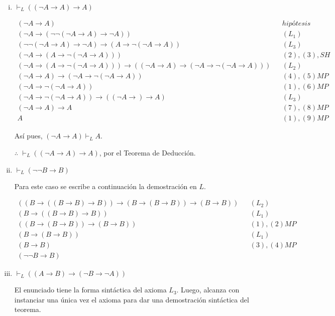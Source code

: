 \documentclass[osajnl,twocolumn,showpacs,superscriptaddress,10pt,leqno]{revtex4-1} %
\begin{document}
\begin{enumerate}[i.]
    \item $\vdash_L ((\neg A \rightarrow A) \rightarrow A)$

    \begin{align}
        (\neg A \rightarrow A) && hipótesis \\
        (\neg A \rightarrow (\neg \neg (\neg A \rightarrow A) \rightarrow \neg A)) && (L_{1}) \\
        (\neg \neg (\neg A \rightarrow A) \rightarrow \neg A) \rightarrow (A \rightarrow \neg (\neg A \rightarrow A)) && (L_{3}) \\
        (\neg A \rightarrow (A \rightarrow \neg (\neg A \rightarrow A))) && (2), (3), SH \\
        (\neg A \rightarrow (A \rightarrow \neg (\neg A \rightarrow A))) \rightarrow ((\neg A \rightarrow A) \rightarrow (\neg A \rightarrow \neg (\neg A \rightarrow A))) && (L_{2}) \\
        (\neg A \rightarrow A) \rightarrow (\neg A \rightarrow \neg (\neg A \rightarrow A)) && (4), (5) MP \\
        (\neg A \rightarrow \neg (\neg A \rightarrow A)) && (1), (6) MP \\
        (\neg A \rightarrow \neg (\neg A \rightarrow A)) \rightarrow ((\neg A \rightarrow) \rightarrow A) && (L_{3}) \\
        (\neg A \rightarrow A) \rightarrow A && (7), (8) MP \\
        A && (1), (9) MP
    \end{align}

    Así pues, $(\neg A \rightarrow A) \vdash_L A$.
    
    $\therefore$ $\vdash_L ((\neg A \rightarrow A) \rightarrow A)$, por el Teorema de Deducción.

    \item $\vdash_L (\neg \neg B \rightarrow B)$

    Para este caso se escribe a continuación la demostración en $L$.

    \begin{align}
        ((B \rightarrow ((B \rightarrow B) \rightarrow B)) \rightarrow (B \rightarrow (B \rightarrow B)) \rightarrow (B \rightarrow B)) && (L_{2}) \\
        (B \rightarrow ((B \rightarrow B) \rightarrow B)) && (L_{1}) \\
        ((B \rightarrow (B \rightarrow B)) \rightarrow (B \rightarrow B)) && (1), (2) MP \\
        (B \rightarrow (B \rightarrow B)) && (L_{1}) \\
        (B \rightarrow B) && (3), (4) MP \\
        (\neg \neg B \rightarrow B)
    \end{align}

    \item $\vdash_L ((A \rightarrow B) \rightarrow (\neg B \rightarrow \neg A))$

    El enunciado tiene la forma sintáctica del axioma $L_{3}$. Luego, alcanza con instanciar una
    única vez el axioma para dar una demostración sintáctica del teorema.
\end{enumerate}
\end{document}
